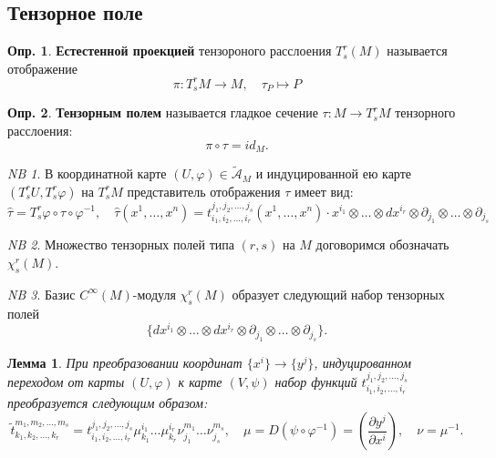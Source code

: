 \documentclass[12pt]{article}
\theoremstyle{plain}
\theoremstyle{lemma}
\newtheorem{lemma}{Лемма}
\theoremstyle{corollary}
\theoremstyle{proposition}
\theoremstyle{exercise}
\theoremstyle{example}
\theoremstyle{remark}
\newtheorem{remark}{NB}
\theoremstyle{definition}
\newtheorem{definition}{Опр.}
\newcommand\tld{\widetilde}
\begin{document}
\subsection{Тензорное поле}

\begin{definition}
    \textbf{Естестенной проекцией} тензороного расслоения $T^r_s(M)$ называется отображение 
    \begin{equation*}
        \pi: T^r_sM \to M, \quad \tau_P \mapsto P
    \end{equation*}
\end{definition}

\begin{definition}
    \textbf{Тензорным полем} называется гладкое сечение $\tau: M \to T^r_sM$ тензорного расслоения:
    \begin{equation*}
        \pi \circ \tau = id_M.
    \end{equation*}
\end{definition}

\begin{remark}
    В координатной карте $(U, \varphi) \in \tld{\mathcal{A}}_M$ и индуцированной ею карте 
    $(T^r_sU, T^r_s \varphi)$ на $T^r_sM$ представитель отображения $\tau$ имеет вид:
    \begin{equation*}
        \widehat{\tau} = T^r_s\varphi \circ \tau \circ \varphi^{-1}, \quad 
        \widehat{\tau}(x^1, \ldots, x^n) = t_{i_1, i_2, \ldots, i_r}^{j_1, j_2, \ldots, j_s}(x^1, \ldots, x^n) \cdot
        x^{i_1} \otimes \ldots \otimes dx^{i_r} \otimes \partial_{j_1} \otimes \ldots \otimes \partial_{j_s}
    \end{equation*} 
\end{remark}

\begin{remark}
    Множество тензорных полей типа $(r,s)$ на $M$ договоримся обозначать $\chi^r_s(M)$.
\end{remark}

\begin{remark}
    Базис $C^\infty(M)$-модуля $\chi^r_s(M)$ образует следующий набор тензорных полей 
    \begin{equation*}
        \{dx^{i_1} \otimes \ldots \otimes dx^{i_r} \otimes \partial_{j_1} \otimes \ldots \otimes \partial_{j_s}\}.
    \end{equation*}
\end{remark}

\begin{lemma}
    При преобразовании координат $\{x^i\} \to \{y^j\}$, индуцированном переходом от карты 
    $(U,\varphi)$ к карте $(V,\psi)$ набор функций $t_{i_1, i_2, \ldots, i_r}^{j_1, j_2, \ldots, j_s}$ 
    преобразуется следующим образом:
    \begin{equation*}
        \tld{t}_{k_1, k_2, \ldots, k_r}^{m_1, m_2, \ldots, m_s} = 
        t_{i_1, i_2, \ldots, i_r}^{j_1, j_2, \ldots, j_s} \mu^{i_1}_{k_1} \ldots \mu^{i_r}_{k_r}\nu_{j_1}^{m_1} \ldots \nu_{j_s}^{m_s}, \quad 
        \mu = D(\psi \circ \varphi^{-1}) = \left(\frac{\partial y^j}{\partial x^i}\right), \quad 
        \nu = \mu^{-1}.
    \end{equation*}
\end{lemma}
\end{document}
